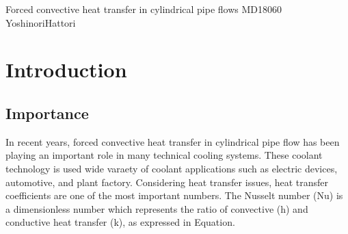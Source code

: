 \documentclass[a4j,12pt,oneside]{jbook}
\begin{document}
\thesistitle
	{Forced convective heat transfer in cylindrical pipe flows} %
	{MD18060} %
	{Yoshinori}{Hattori} %
    {}{}
\tableofcontents
\chapter{Introduction}
\section{Importance}
In recent years, forced convective heat transfer in cylindrical pipe flow has been playing an important role in many technical cooling systems.
These coolant technology is used wide varaety of coolant applications such as electric devices, automotive, and plant factory.
Considering heat transfer issues, heat transfer coefficients are one of the most important numbers.
The Nusselt number (Nu) is a dimensionless number which represents the ratio of convective (h) and conductive heat transfer (k), as expressed in Equation.
\end{document}
